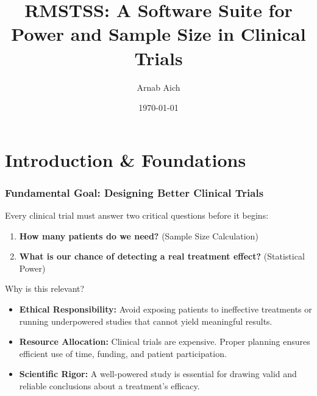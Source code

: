 \documentclass{beamer}
\date{}
\title[RMSTSS]{RMSTSS: A Software Suite for Power and Sample Size in Clinical Trials}
\author{Arnab Aich}
\institute{Florida State University}
\date{\today}
\begin{document}
\begin{frame}
  \titlepage
\end{frame}

\section{Introduction \& Foundations}

\begin{frame}
\frametitle{Fundamental Goal: Designing Better Clinical Trials}
Every clinical trial must answer two critical questions before it begins:

\begin{enumerate}
    \item \textbf{How many patients do we need?} (Sample Size Calculation)
    \item \textbf{What is our chance of detecting a real treatment effect?} (Statistical Power)
\end{enumerate}

\vspace{1em}

\begin{block}{Why is this relevant?}
\begin{itemize}
    \item \textbf{Ethical Responsibility:} Avoid exposing patients to ineffective treatments or running underpowered studies that cannot yield meaningful results.
    \item \textbf{Resource Allocation:} Clinical trials are expensive. Proper planning ensures efficient use of time, funding, and patient participation.
    \item \textbf{Scientific Rigor:} A well-powered study is essential for drawing valid and reliable conclusions about a treatment's efficacy.
\end{itemize}
\end{block}
\end{frame}
\end{document}
